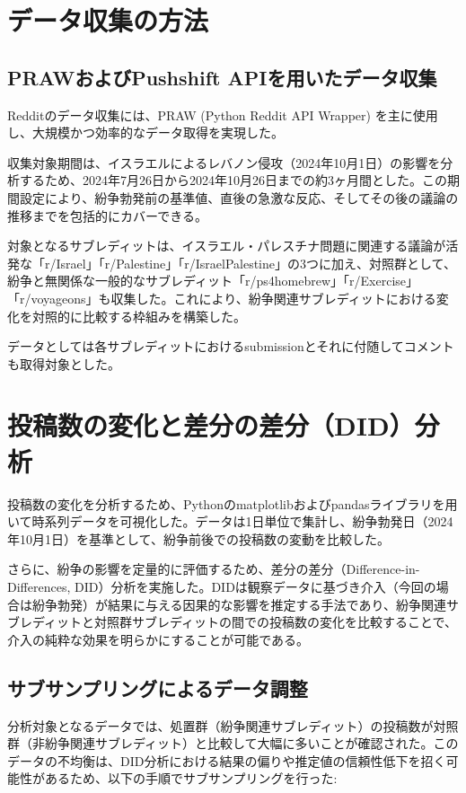 \documentclass[11pt, a4j]{jreport}
\begin{document}
    \section{データ収集の方法}
    \subsection{PRAWおよびPushshift APIを用いたデータ収集}
    Redditのデータ収集には、PRAW (Python Reddit API Wrapper) を主に使用し、大規模かつ効率的なデータ取得を実現した。

    収集対象期間は、イスラエルによるレバノン侵攻（2024年10月1日）の影響を分析するため、2024年7月26日から2024年10月26日までの約3ヶ月間とした。この期間設定により、紛争勃発前の基準値、直後の急激な反応、そしてその後の議論の推移までを包括的にカバーできる。

    対象となるサブレディットは、イスラエル・パレスチナ問題に関連する議論が活発な「r/Israel」「r/Palestine」「r/IsraelPalestine」の3つに加え、対照群として、紛争と無関係な一般的なサブレディット「r/ps4homebrew」「r/Exercise」「r/voyageons」も収集した。これにより、紛争関連サブレディットにおける変化を対照的に比較する枠組みを構築した。

    データとしては各サブレディットにおけるsubmissionとそれに付随してコメントも取得対象とした。

    \section{投稿数の変化と差分の差分（DID）分析}
    投稿数の変化を分析するため、Pythonのmatplotlibおよびpandasライブラリを用いて時系列データを可視化した。データは1日単位で集計し、紛争勃発日（2024年10月1日）を基準として、紛争前後での投稿数の変動を比較した。

    さらに、紛争の影響を定量的に評価するため、差分の差分（Difference-in-Differences, DID）分析を実施した。DIDは観察データに基づき介入（今回の場合は紛争勃発）が結果に与える因果的な影響を推定する手法であり、紛争関連サブレディットと対照群サブレディットの間での投稿数の変化を比較することで、介入の純粋な効果を明らかにすることが可能である。

    \subsection*{サブサンプリングによるデータ調整}
    分析対象となるデータでは、処置群（紛争関連サブレディット）の投稿数が対照群（非紛争関連サブレディット）と比較して大幅に多いことが確認された。このデータの不均衡は、DID分析における結果の偏りや推定値の信頼性低下を招く可能性があるため、以下の手順でサブサンプリングを行った:
\end{document}
